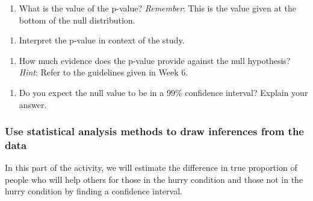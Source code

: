 \documentclass[
]{report}
\providecommand{\tightlist}{%
  \setlength{\itemsep}{0pt}\setlength{\parskip}{0pt}}
\begin{document}
\vspace{.8in}

\begin{enumerate}
\def\labelenumi{\arabic{enumi}.}
\setcounter{enumi}{4}
\tightlist
\item
  What is the value of the p-value? \emph{Remember}: This is the value given at the bottom of the null distribution.
\end{enumerate}

\vspace{0.2in}

\begin{enumerate}
\def\labelenumi{\arabic{enumi}.}
\setcounter{enumi}{5}
\tightlist
\item
  Interpret the p-value in context of the study.
\end{enumerate}

\vspace{1in}

\begin{enumerate}
\def\labelenumi{\arabic{enumi}.}
\setcounter{enumi}{6}
\tightlist
\item
  How much evidence does the p-value provide against the null hypothesis? \emph{Hint}: Refer to the guidelines given in Week 6.
\end{enumerate}

\vspace{0.4in}

\begin{enumerate}
\def\labelenumi{\arabic{enumi}.}
\setcounter{enumi}{7}
\tightlist
\item
  Do you expect the null value to be in a 99\% confidence interval? Explain your answer.
\end{enumerate}

\vspace{0.6in}

\hypertarget{use-statistical-analysis-methods-to-draw-inferences-from-the-data-2}{%
\subsubsection*{Use statistical analysis methods to draw inferences from the data}\label{use-statistical-analysis-methods-to-draw-inferences-from-the-data-2}}

In this part of the activity, we will estimate the difference in true proportion of people who will help others for those in the hurry condition and those not in the hurry condition by finding a confidence interval.
\end{document}
